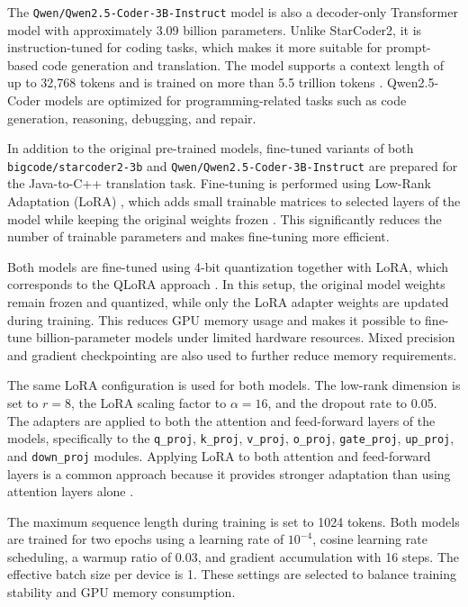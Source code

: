 The \texttt{Qwen/Qwen2.5-Coder-3B-Instruct} model is also a decoder-only
Transformer model with approximately 3.09 billion parameters. Unlike
StarCoder2, it is instruction-tuned for coding tasks, which makes it more
suitable for prompt-based code generation and translation. The model supports a
context length of up to 32,768 tokens and is trained on more than 5.5 trillion
tokens \cite{qwen_coder, qwen_coder_report}. Qwen2.5-Coder models are optimized
for programming-related tasks such as code generation, reasoning, debugging,
and repair.

In addition to the original pre-trained models, fine-tuned variants of both
\texttt{bigcode/starcoder2-3b} and \texttt{Qwen/Qwen2.5-Coder-3B-Instruct} are
prepared for the Java-to-C++ translation task. Fine-tuning is performed using
Low-Rank Adaptation (LoRA) \cite{hu2021lora, lora_modules, qwen_lora},
which adds small trainable matrices to selected
layers of the model while keeping the original weights frozen
\cite{hu2021lora}. This significantly reduces the number of trainable parameters
and makes fine-tuning more efficient.

Both models are fine-tuned using 4-bit quantization together with LoRA, which
corresponds to the QLoRA approach \cite{qwen_lora_repo, qwen_lora, dettmers2023qlora}. In this setup, the original model weights
remain frozen and quantized, while only the LoRA adapter weights are updated
during training. This reduces GPU memory usage and makes it possible to
fine-tune billion-parameter models under limited hardware resources. Mixed
precision and gradient checkpointing are also used to further reduce memory
requirements.


The same LoRA configuration is used for both models. The low-rank dimension
is set to $r = 8$, the LoRA scaling factor to $\alpha = 16$, and the dropout
rate to 0.05. The adapters are applied to both the attention and feed-forward
layers of the models, specifically to the
\texttt{q\_proj}, \texttt{k\_proj}, \texttt{v\_proj},
\texttt{o\_proj}, \texttt{gate\_proj}, \texttt{up\_proj}, and
\texttt{down\_proj} modules. Applying LoRA to both attention and feed-forward
layers is a common approach because it provides stronger adaptation than using
attention layers alone \cite{lora_modules, hu2021lora}.

The maximum sequence length during training is set to 1024 tokens. Both models
are trained for two epochs using a learning rate of $10^{-4}$, cosine learning
rate scheduling, a warmup ratio of 0.03, and gradient accumulation with 16
steps. The effective batch size per device is 1. These settings are selected
to balance training stability and GPU memory consumption.
